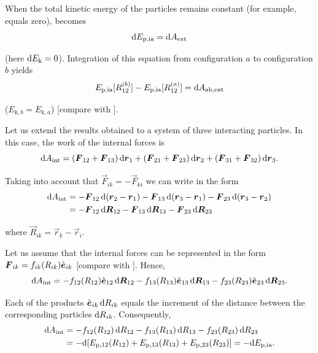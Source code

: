 When the total kinetic energy of the particles remains constant (for example, equals zero),  becomes
\begin{equation}\label{eq:3_52}
\mathrm{d} E_{\text{p,ia}} = \mathrm{d} A_{\text{ext}}
\end{equation}

\noindent
(here $\mathrm{d} E_{\text{k}}=0$). Integration of this equation from configuration $a$ to configuration $b$ yields
\begin{equation}\label{eq:3_53}
E_{\text{p,ia}}[R_{12}^{(b)}] - E_{\text{p,ia}}[R_{12}^{(a)}] = \mathrm{d} A_{\text{ab,ext}}
\end{equation}

\noindent
($E_{\text{k},b}=E_{\text{k},a}$) [compare with ].

Let us extend the results obtained to a system of three interacting particles. In this case, the work of the internal forces is
\begin{equation}\label{eq:3_54}
\mathrm{d} A_{\text{int}} = (\boldsymbol{F}_{12} + \boldsymbol{F}_{13})\,\mathrm{d}\boldsymbol{r}_1 + (\boldsymbol{F}_{21} + \boldsymbol{F}_{23})\,\mathrm{d}\boldsymbol{r}_2 + (\boldsymbol{F}_{31} + \boldsymbol{F}_{32})\,\mathrm{d}\boldsymbol{r}_3.
\end{equation}

\noindent
Taking into account that $\vec{F}_{ik}=-\vec{F}_{ki}$ we can write  in the form
\begin{align}
\mathrm{d} A_{\text{int}} &= - \boldsymbol{F}_{12}\,\mathrm{d}(\boldsymbol{r}_2-\boldsymbol{r}_1) - \boldsymbol{F}_{13}\,\mathrm{d}(\boldsymbol{r}_3-\boldsymbol{r}_1) - \boldsymbol{F}_{23}\,\mathrm{d}(\boldsymbol{r}_3-\boldsymbol{r}_2)\nonumber\\
&= - \boldsymbol{F}_{12}\,\mathrm{d}\boldsymbol{R}_{12} - \boldsymbol{F}_{13}\,\mathrm{d}\boldsymbol{R}_{13} - \boldsymbol{F}_{23}\,\mathrm{d}\boldsymbol{R}_{23}\label{eq:3_55}
\end{align}

\noindent
where $\vec{R}_{ik}=\vec{r}_k-\vec{r}_i$.

Let us assume that the internal forces can be represented in the form $\boldsymbol{F}_{ik}=f_{ik}(R_{ik})\hat{\boldsymbol{e}}_{ik}$ [compare with ]. Hence,
\begin{equation*}
\mathrm{d} A_{\text{int}} = - f_{12}(R_{12})\hat{\boldsymbol{e}}_{12}\,\mathrm{d}\boldsymbol{R}_{12} - f_{13}(R_{13})\hat{\boldsymbol{e}}_{13}\,\mathrm{d}\boldsymbol{R}_{13} - f_{23}(R_{23})\hat{\boldsymbol{e}}_{23}\,\mathrm{d}\boldsymbol{R}_{23}.
\end{equation*}

\noindent
Each of the products $\hat{\boldsymbol{e}}_{ik}\,\mathrm{d} R_{ik}$ equals the increment of the distance between the corresponding particles $\mathrm{d} R_{ik}$. Consequently,
\begin{align}
\mathrm{d} A_{\text{int}} &= - f_{12}(R_{12})\,\mathrm{d} R_{12} - f_{13}(R_{13})\,\mathrm{d} R_{13} - f_{23}(R_{23})\,\mathrm{d} R_{23}\nonumber\\
&= - \mathrm{d}[E_{\text{p},12}(R_{12}) + E_{\text{p},13}(R_{13}) + E_{\text{p},23}(R_{23})] = - \mathrm{d} E_{\text{p,ia}}.\label{eq:3_56}
\end{align}

